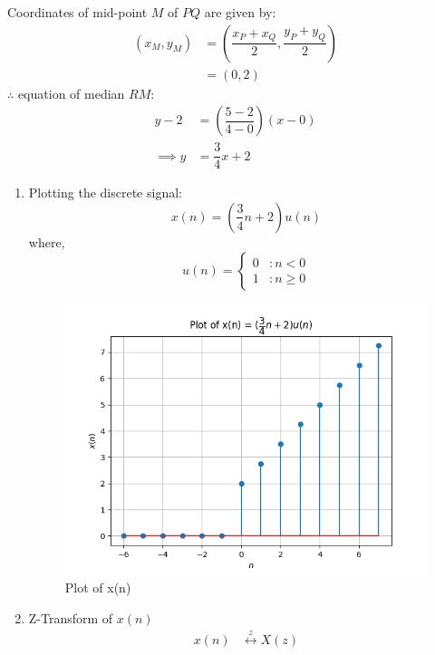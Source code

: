\documentclass[journal,12pt,twocolumn]{IEEEtran}
\theoremstyle{remark}
\begin{document}
Coordinates of mid-point $M$ of $PQ$ are given by:
\begin{align}
    (x_M, y_M) &= \left(\dfrac{x_P + x_Q}{2}, \dfrac{y_P + y_Q}{2}\right)\\
    &= (0, 2)
\end{align}
$\therefore$ equation of median $RM$:
\begin{align}
    y-2 &= \left(\dfrac{5-2}{4-0}\right)(x-0)\\
    \implies y &= \dfrac{3}{4} x + 2
\end{align}
\begin{enumerate}
\item Plotting the discrete signal:
    \begin{equation}
        x(n) = \left(\dfrac{3}{4} n + 2\right) u(n)
    \end{equation}
    where,
    \begin{equation}
        u(n) = \begin{cases}
                    0 & :n<0\\
                    1 & :n \geq 0
               \end{cases}
    \end{equation}
    \begin{figure}[!h]
        \centering
        \includegraphics[width = \columnwidth]{figs/fig2.png}
        \caption{Plot of x(n)}
        \label{fig:2}
    \end{figure}
\item Z-Transform of $x(n)$
    \begin{align}
        x(n) &\overset{z}{\longleftrightarrow} X(z)\\  

\end{align}
\end{enumerate}
\end{document}
